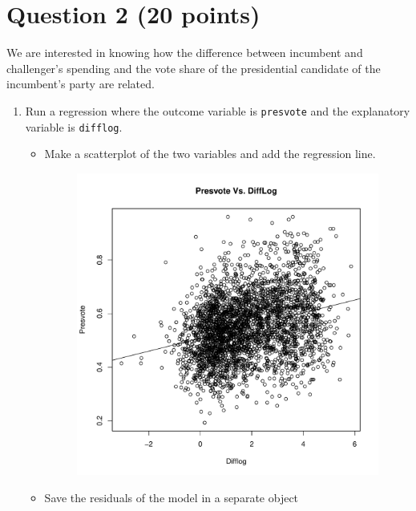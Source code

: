 \documentclass[12pt,letterpaper]{article}
\begin{document}
\section*{Question 2 (20 points)}
\noindent We are interested in knowing how the difference between incumbent and challenger's spending and the vote share of the presidential candidate of the incumbent's party are related.	\vspace{.25cm}
	\begin{enumerate}
		\item Run a regression where the outcome variable is \texttt{presvote} and the explanatory variable is \texttt{difflog}.
		
		
		\begin{itemize}
		\item Make a scatterplot of the two variables and add the regression line. 
			\begin{figure}[h!]\centering
			\caption{\footnotesize
			}\vspace{-1cm}
			\includegraphics[width=.75\textwidth]{plot_Q2_2.pdf}\\
		\end{figure}
\end{itemize}
\newpage
\begin{itemize}
		\item Save the residuals of the model in a separate object
			\begin{figure}[h!]\centering
			\caption{\footnotesize
			}\vspace{-1cm}

\end{figure}
\end{itemize}
\end{enumerate}
\end{document}
